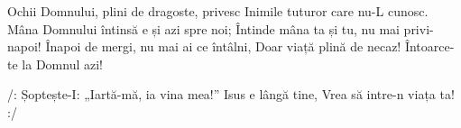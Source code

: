 \beginverse
Ochii Domnului, plini de dragoste, privesc
Inimile tuturor care nu-L cunosc.
Mâna Domnului întinsă e și azi spre noi;
Întinde mâna ta și tu, nu mai privi-napoi!
Înapoi de mergi, nu mai ai ce întâlni,
Doar viață plină de necaz!
Întoarce-te la Domnul azi!
\endverse

\beginchorus
/: Șoptește-I:
„Iartă-mă, ia vina mea!”
Isus e lângă tine,
Vrea să intre-n viața ta! :/
\endchorus
\endsong